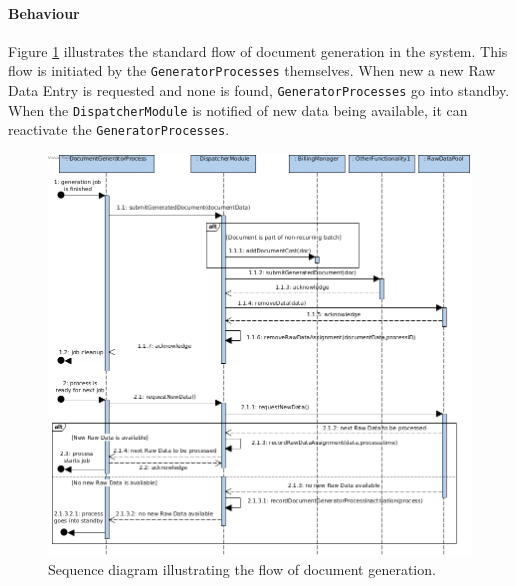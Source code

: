 \documentclass[a4paper,10pt]{article}
\begin{document}
\paragraph{Behaviour}
Figure \ref{fig:it1-seq_aspect1} illustrates the standard flow of document generation in the system. This flow is initiated by the \texttt{GeneratorProcesses} themselves. When new a new Raw Data Entry is requested and none is found, \texttt{GeneratorProcesses} go into standby. When the \texttt{DispatcherModule} is notified of new data being available, it can reactivate the \texttt{GeneratorProcesses}.

\begin{figure}[!htp]
    \centering
    \includegraphics[width=\textwidth]{seq_diag_1_-_doc_gen.png}
    \caption{Sequence diagram illustrating the flow of document generation.}\label{fig:it1-seq_aspect1}
\end{figure}
\end{document}

